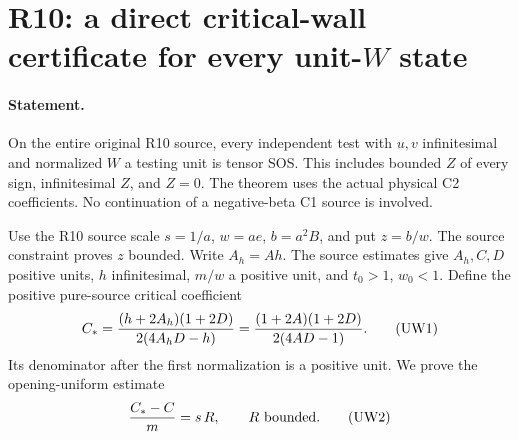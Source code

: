 \section{R10: a direct critical-wall certificate for every unit-$W$ state}
\paragraph{Statement.}
On the entire original R10 source, every independent test with $u,v$
infinitesimal and normalized $W$ a testing unit is tensor SOS. This
includes bounded $Z$ of every sign, infinitesimal $Z$, and $Z=0$.
The theorem uses the actual physical C2 coefficients. No continuation
of a negative-beta C1 source is involved.

Use the R10 source scale $s=1/a$, $w=ae$, $b=a^2B$, and put
$z=b/w$. The source constraint proves $z$ bounded. Write $A_h=Ah$.
The source estimates give $A_h,C,D$ positive units, $h$ infinitesimal,
$m/w$ a positive unit, and $t_0>1$, $w_0<1$.
Define the positive pure-source critical coefficient
\[
 C_*={ (h+2A_h)(1+2D)\over 2(4A_hD-h)}
     ={(1+2A)(1+2D)\over2(4AD-1)}.
 \tag{UW1}
\]
Its denominator after the first normalization is a positive unit.
We prove the opening-uniform estimate
\[
                 {C_*-C\over m}=s\,R,
                 \qquad R\text{ bounded}.             \tag{UW2}
\]

